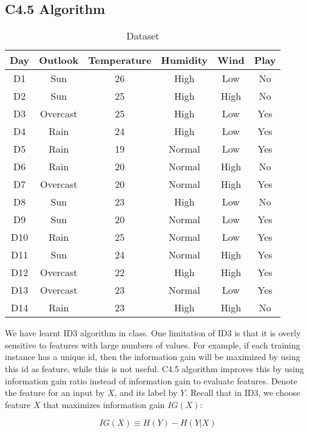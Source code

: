 \subsection{C4.5 Algorithm}
\begin{table}[h]
    \centering
        \begin{tabular}{|c|cccc|c|}
            \hline
            Day & Outlook & Temperature & Humidity & Wind & Play \\
            \hline
            D1 & Sun & 26 & High & Low & No \\
            D2 & Sun & 25 & High & High & No \\ 
            D3 & Overcast & 25 & High & Low & Yes \\
            D4 & Rain & 24 & High & Low & Yes \\
            D5 & Rain & 19 & Normal & Low & Yes \\ 
            D6 & Rain & 20 & Normal & High & No \\
            D7 & Overcast & 20 & Normal & High & Yes \\
            D8 & Sun & 23 & High & Low & No \\
            D9 & Sun & 20 & Normal & Low & Yes \\
            D10 & Rain & 25 & Normal & Low & Yes \\
            D11 & Sun & 24 & Normal & High & Yes \\
            D12 & Overcast & 22 & High & High & Yes \\
            D13 & Overcast & 23 & Normal & Low & Yes \\
            D14 & Rain & 23 & High & High & No \\
            \hline
        \end{tabular}
\caption{Dataset}
\label{tab: C45}
\end{table}

We have learnt ID3 algorithm in class. One limitation of ID3 is that it is overly sensitive to features with large numbers of values. For example, if each training instance has a unique id, then the information gain will be maximized by using this id as feature, while this is not useful. C4.5 algorithm improves this by using information gain ratio instead of information gain to evaluate features. Denote the feature for an input by $X$, and its label by $Y$. Recall that in ID3, we choose feature $X$ that maximizes information gain $IG(X)$:

$$
IG(X) \equiv  H(Y) - H(Y|X)
$$

